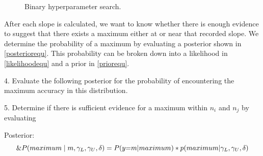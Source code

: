 \documentclass[runningheads]{llncs}
\begin{document}
\begin{figure} [H]
     \centering
     
     \hfill
    \caption{Binary hyperparameter search.}
    \label{fig:binarysearch}
\end{figure}

After each slope is calculated, we want to know whether there is enough evidence to suggest that there exists a maximum either at or near that recorded slope. We determine the probability of a maximum by evaluating a posterior shown in \autoref{posteriorequ}. This probability can be broken down into a likelihood in \autoref{likelihoodequ} and a prior in \autoref{priorequ}.



4. Evaluate the following posterior for the probability of encountering the maximum accuracy in this distribution. 

5. Determine if there is sufficient evidence for a maximum within $n_i$ and $n_j$ by evaluating

Posterior:
\begin{equation}\label{posteriorequ}
    \centering
    \&P(maximum \mid m, \gamma_{L}, \gamma_{U}, \delta) = P(y{=}m {\mid} maximum) * p(maximum {\mid} \gamma_{L}, \gamma_{U}, \delta)
\end{equation}
\end{document}
